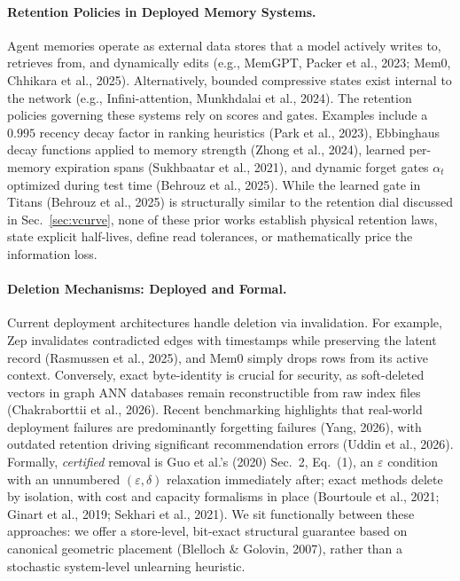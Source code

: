 \documentclass{article}
\begin{document}
\paragraph{Retention Policies in Deployed Memory Systems.}
Agent memories operate as external data stores that a model actively writes to, retrieves from, and dynamically edits (e.g., MemGPT, Packer et al., 2023; Mem0, Chhikara et al., 2025). Alternatively, bounded compressive states exist internal to the network (e.g., Infini-attention, Munkhdalai et al., 2024). The retention policies governing these systems rely on scores and gates. Examples include a $0.995$ recency decay factor in ranking heuristics (Park et al., 2023), Ebbinghaus decay functions applied to memory strength (Zhong et al., 2024), learned per-memory expiration spans (Sukhbaatar et al., 2021), and dynamic forget gates $\alpha_t$ optimized during test time (Behrouz et al., 2025). While the learned gate in Titans (Behrouz et al., 2025) is structurally similar to the retention dial discussed in Sec.~\ref{sec:vcurve}, none of these prior works establish physical retention laws, state explicit half-lives, define read tolerances, or mathematically price the information loss.

\paragraph{Deletion Mechanisms: Deployed and Formal.}
Current deployment architectures handle deletion via invalidation. For example, Zep invalidates contradicted edges with timestamps while preserving the latent record (Rasmussen et al., 2025), and Mem0 simply drops rows from its active context. Conversely, exact byte-identity is crucial for security, as soft-deleted vectors in graph ANN databases remain reconstructible from raw index files (Chakraborttii et al., 2026). Recent benchmarking highlights that real-world deployment failures are predominantly forgetting failures (Yang, 2026), with outdated retention driving significant recommendation errors (Uddin et al., 2026). Formally, \emph{certified} removal is Guo et al.'s (2020) Sec.~2, Eq.~(1), an $\varepsilon$ condition with an unnumbered $(\varepsilon,\delta)$ relaxation immediately after; exact methods delete by isolation, with cost and capacity formalisms in place (Bourtoule et al., 2021; Ginart et al., 2019; Sekhari et al., 2021). We sit functionally between these approaches: we offer a store-level, bit-exact structural guarantee based on canonical geometric placement (Blelloch \& Golovin, 2007), rather than a stochastic system-level unlearning heuristic.
\end{document}
